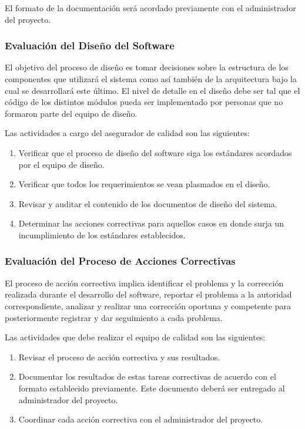 \documentclass[a4paper,10pt]{article}
\begin{document}
	El formato de la documentación será acordado previamente con el administrador del proyecto.
	
	\subsubsection{Evaluación del Diseño del Software}
	El objetivo del proceso de diseño es tomar decisiones sobre la estructura de los componentes que utilizará el sistema como así también de la arquitectura bajo la cual se desarrollará este último. El nivel de detalle en el diseño debe ser tal que el código de los distintos módulos pueda ser implementado por personas que no formaron parte del equipo de diseño.
	
	Las actividades a cargo del asegurador de calidad son las siguientes:
	\begin{enumerate}
		\item Verificar que el proceso de diseño del software siga los estándares acordados por el equipo de diseño.
		\item Verificar que todos los requerimientos se vean plasmados en el diseño.
		\item Revisar y auditar el contenido de los documentos de diseño del sistema.
		\item Determinar las acciones correctivas para aquellos casos en donde surja un incumplimiento de los estándares establecidos.
	\end{enumerate}
	
	\subsubsection{Evaluación del Proceso de Acciones Correctivas}
	El proceso de acción correctiva implica identificar el problema y la corrección realizada durante el desarrollo del software, reportar el problema a la autoridad correspondiente, analizar y realizar una corrección oportuna y competente para posteriormente registrar y dar seguimiento a cada problema.
	
	Las actividades que debe realizar el equipo de calidad son las siguientes:
	\begin{enumerate}
		\item Revisar el proceso de acción correctiva y sus resultados.
		\item Documentar los resultados de estas tareas correctivas de acuerdo con el formato establecido previamente. Este documento deberá ser entregado al administrador del proyecto.
		\item Coordinar cada acción correctiva con el administrador del proyecto.
	\end{enumerate}
	
\end{document}
